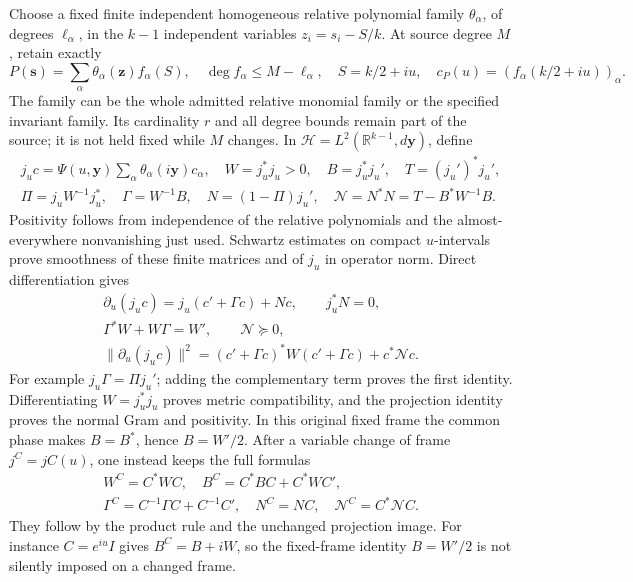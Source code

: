 Choose a fixed finite independent homogeneous relative polynomial
family \(\theta_\alpha\), of degrees \(\ell_\alpha\), in the
\(k-1\) independent variables \(z_i=s_i-S/k\). At source degree
\(M\), retain exactly
\[
 P(\mathbf s)=\sum_\alpha\theta_\alpha(\mathbf z)f_\alpha(S),
 \quad \deg f_\alpha\le M-\ell_\alpha,
 \quad S=k/2+iu,
 \quad c_P(u)=(f_\alpha(k/2+iu))_\alpha.
 \tag{FC.5}
\]
The family can be the whole admitted relative monomial family or the
specified invariant family. Its cardinality \(r\) and all degree
bounds remain part of the source; it is not held fixed while \(M\)
changes. In \(\mathscr H=L^2(\mathbb R^{k-1},d\mathbf y)\), define
\[
 \begin{gathered}
 j_uc=\Psi(u,\mathbf y)\sum_\alpha\theta_\alpha(i\mathbf y)c_\alpha,
 \quad W=j_u^*j_u>0,\quad B=j_u^*j_u',\quad T=(j_u')^*j_u',\\
 \Pi=j_uW^{-1}j_u^*,\quad \Gamma=W^{-1}B,\quad
 N=(1-\Pi)j_u',\quad \mathcal N=N^*N=T-B^*W^{-1}B.
 \end{gathered}
 \tag{FC.6}
\]
Positivity follows from independence of the relative polynomials and
the almost-everywhere nonvanishing just used. Schwartz estimates on
compact \(u\)-intervals prove smoothness of these finite matrices
and of \(j_u\) in operator norm. Direct differentiation gives
\[
 \begin{gathered}
 \partial_u(j_uc)=j_u(c'+\Gamma c)+Nc,\qquad j_u^*N=0,\\
 \Gamma^*W+W\Gamma=W',\qquad \mathcal N\succeq0,\\
 \|\partial_u(j_uc)\|^2
       =(c'+\Gamma c)^*W(c'+\Gamma c)+c^*\mathcal Nc.
 \end{gathered}
 \tag{FC.7}
\]
For example \(j_u\Gamma=\Pi j_u'\); adding the complementary
term proves the first identity. Differentiating \(W=j_u^*j_u\)
proves metric compatibility, and the projection identity proves the
normal Gram and positivity. In this original fixed frame the common
phase makes \(B=B^*\), hence \(B=W'/2\). After a variable change
of frame \(j^C=jC(u)\), one instead keeps the full formulas
\[
 \begin{gathered}
 W^C=C^*WC,\quad B^C=C^*BC+C^*WC',\\
 \Gamma^C=C^{-1}\Gamma C+C^{-1}C',\quad N^C=NC,
 \quad \mathcal N^C=C^*\mathcal NC.
 \end{gathered}
 \tag{FC.8}
\]
They follow by the product rule and the unchanged projection image.
For instance \(C=e^{iu}I\) gives \(B^C=B+iW\), so the fixed-frame
identity \(B=W'/2\) is not silently imposed on a changed frame.

